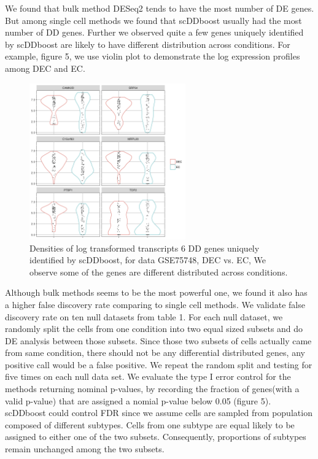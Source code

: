 \documentclass[11pt]{amsart}
\begin{document}
We found that bulk method DESeq2 tends to have the most number of DE genes. But among single cell methods we found that scDDboost usually had the most number of DD genes. Further we observed quite a few genes uniquely identified by scDDboost are likely to have different distribution across conditions. For example, figure 5, we use violin plot to demonstrate the log expression profiles among DEC and EC. \\
\begin{figure}[H]
\includegraphics[width = 0.6\textwidth]{density_DEC_dd.png}
 \caption{ Densities of log transformed transcripts 6 DD genes uniquely identified by scDDboost, for data GSE75748, DEC vs. EC, We observe some of the genes are different distributed across conditions.}
  \label{fig:6}
\end{figure}

Although bulk methods seems to be the most powerful one, we found it also has a higher false discovery rate comparing to single cell methods. We validate false discovery rate on ten null datasets from table 1. For each null dataset, we randomly split the cells from one condition into two equal sized subsets and do DE analysis between those subsets. Since those two subsets of cells actually came from same condition, there should not be any differential distributed genes, any positive call would be a false positive. We repeat the random split and testing for five times on each null data set. We evaluate the type I error control for the methods returning nominal p-values, by recording the fraction of genes(with a valid p-value) that are assigned a nomial p-value below 0.05 (figure 5).\\
scDDboost could control FDR since we assume cells are sampled from population composed of different subtypes. Cells from one subtype are equal likely to be assigned to either one of the two subsets. Consequently, proportions of subtypes remain unchanged among the two subsets.
\end{document}
